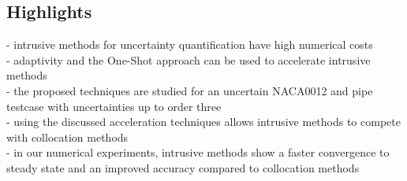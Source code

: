 \documentclass[10pt,a4paper]{article}      %
\begin{document}
\subsection*{Highlights}
- intrusive methods for uncertainty quantification have high numerical costs\\
- adaptivity and the One-Shot approach can be used to accelerate intrusive methods\\
- the proposed techniques are studied for an uncertain NACA0012 and pipe testcase with uncertainties up to order three\\
- using the discussed acceleration techniques allows intrusive methods to compete with collocation methods \\
- in our numerical experiments, intrusive methods show a faster convergence to steady state and an improved accuracy compared to collocation methods
\end{document}
